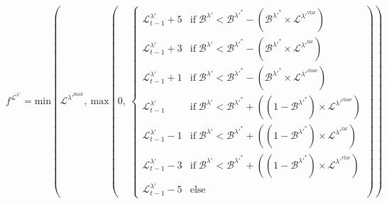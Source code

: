 \documentclass[class=article, crop=false]{standalone}
\begin{document}
    $$
        f^{\mathscr{L}^{\lambda'}} = 
            \text{min}\left(
                \mathscr{L}^{\lambda'^{\text{max}}},\ 
                \text{max}\left(
                    0,\ 
                    \begin{cases}
                        \mathscr{L}_{t-1}^{\lambda'} + 5
                        & \text{if} \; \mathscr{B}^{\lambda'} < \mathscr{B}^{\lambda'^{*}} - ( \mathscr{B}^{\lambda'^{*}} \times \mathscr{L}^{\lambda'^{\text{vfar}}})  \\
                        
                        \mathscr{L}_{t-1}^{\lambda'} + 3
                        & \text{if} \; \mathscr{B}^{\lambda'} < \mathscr{B}^{\lambda'^{*}} - ( \mathscr{B}^{\lambda'^{*}} \times \mathscr{L}^{\lambda'^{\text{far}}})  \\
                        
                        \mathscr{L}_{t-1}^{\lambda'} + 1 
                        & \text{if} \; \mathscr{B}^{\lambda'} < \mathscr{B}^{\lambda'^{*}} - ( \mathscr{B}^{\lambda'^{*}} \times \mathscr{L}^{\lambda'^{\text{close}}})  \\
                        
                        \mathscr{L}_{t-1}^{\lambda'}
                        & \text{if} \; \mathscr{B}^{\lambda'} < \mathscr{B}^{\lambda'^{*}} + ((1 - \mathscr{B}^{\lambda'^{*}}) \times \mathscr{L}^{\lambda'^{\text{close}}})  \\
                        
                        \mathscr{L}_{t-1}^{\lambda'} - 1
                        & \text{if} \; \mathscr{B}^{\lambda'} < \mathscr{B}^{\lambda'^{*}} + ((1 - \mathscr{B}^{\lambda'^{*}}) \times \mathscr{L}^{\lambda'^{\text{far}}})  \\

                        \mathscr{L}_{t-1}^{\lambda'} - 3
                        & \text{if} \; \mathscr{B}^{\lambda'} < \mathscr{B}^{\lambda'^{*}} + ((1 - \mathscr{B}^{\lambda'^{*}}) \times \mathscr{L}^{\lambda'^{\text{vfar}}})  \\
                        
                        \mathscr{L}_{t-1}^{\lambda'} - 5
                            & \text{else}
                    \end{cases} 
                \right)
            \right)
    $$
\end{document}
